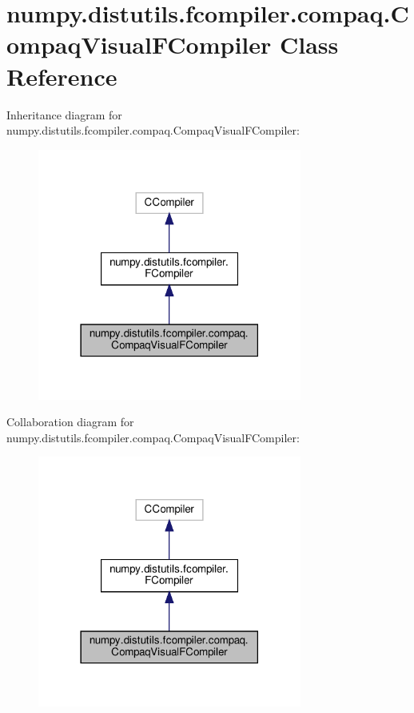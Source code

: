 \hypertarget{classnumpy_1_1distutils_1_1fcompiler_1_1compaq_1_1CompaqVisualFCompiler}{}\section{numpy.\+distutils.\+fcompiler.\+compaq.\+Compaq\+Visual\+F\+Compiler Class Reference}
\label{classnumpy_1_1distutils_1_1fcompiler_1_1compaq_1_1CompaqVisualFCompiler}


Inheritance diagram for numpy.\+distutils.\+fcompiler.\+compaq.\+Compaq\+Visual\+F\+Compiler\+:
\nopagebreak
\begin{figure}[H]
\begin{center}
\leavevmode
\includegraphics[width=246pt]{classnumpy_1_1distutils_1_1fcompiler_1_1compaq_1_1CompaqVisualFCompiler__inherit__graph}
\end{center}
\end{figure}


Collaboration diagram for numpy.\+distutils.\+fcompiler.\+compaq.\+Compaq\+Visual\+F\+Compiler\+:
\nopagebreak
\begin{figure}[H]
\begin{center}
\leavevmode
\includegraphics[width=246pt]{classnumpy_1_1distutils_1_1fcompiler_1_1compaq_1_1CompaqVisualFCompiler__coll__graph}
\end{center}
\end{figure}
